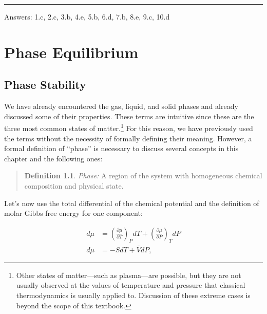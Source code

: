 \documentclass[
  9pt,
]{extbook}
\theoremstyle{definition}
\newtheorem{definition}{Definition}[chapter]
\theoremstyle{definition}
\theoremstyle{definition}
\theoremstyle{remark}
\begin{document}
\begin{center}\rule{0.5\linewidth}{0.5pt}\end{center}

Answers: 1.c, 2.c, 3.b, 4.e, 5.b, 6.d, 7.b, 8.e, 9.c, 10.d

\renewcommand*{\standardstate}{{-\kern-6pt{\ominus}\kern-6pt-}}

\hypertarget{PhaseEquilibrium}{%
\chapter{Phase Equilibrium}\label{PhaseEquilibrium}}

\hypertarget{phase-stability}{%
\section{Phase Stability}\label{phase-stability}}

We have already encountered the gas, liquid, and solid phases and already discussed some of their properties. These terms are intuitive since these are the three most common states of matter.\footnote{Other states of matter---such as plasma---are possible, but they are not usually observed at the values of temperature and pressure that classical thermodynamics is usually applied to. Discussion of these extreme cases is beyond the scope of this textbook.} For this reason, we have previously used the terms without the necessity of formally defining their meaning. However, a formal definition of ``phase'' is necessary to discuss several concepts in this chapter and the following ones:

\begin{quote}
\begin{definition}
\protect\hypertarget{def:phasedef}{}{\label{def:phasedef} }\emph{Phase:} A region of the system with homogeneous chemical composition and physical state.
\end{definition}
\end{quote}

Let's now use the total differential of the chemical potential and the definition of molar Gibbs free energy for one component:

\begin{equation}
\begin{aligned}
d\mu &= \left( \frac{\partial \mu}{\partial T} \right)_P dT + \left( \frac{\partial \mu}{\partial P} \right)_T dP \\
d\mu &= -SdT+\overline{V}dP,
\end{aligned}
\label{eq:muequal1}
\end{equation}
\end{document}
